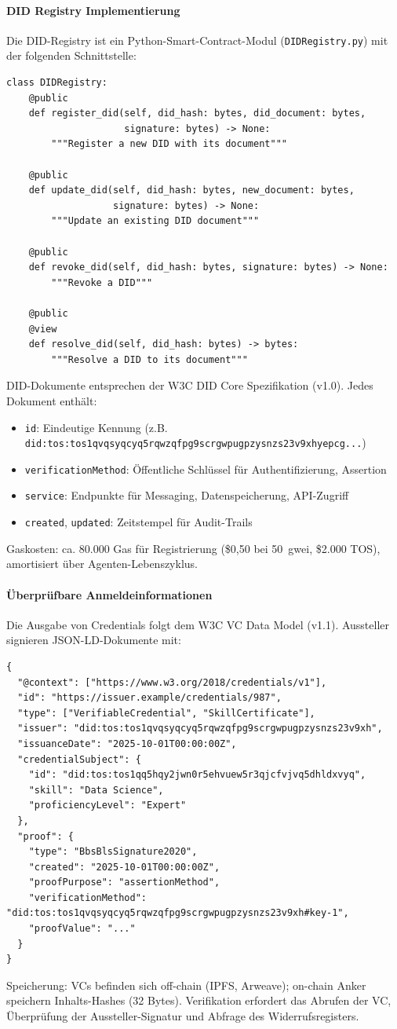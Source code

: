 \documentclass[11pt]{article}
\begin{document}
\paragraph{DID Registry Implementierung} Die DID-Registry ist ein Python-Smart-Contract-Modul (\texttt{DIDRegistry.py}) mit der folgenden Schnittstelle:
\begin{verbatim}
class DIDRegistry:
    @public
    def register_did(self, did_hash: bytes, did_document: bytes,
                     signature: bytes) -> None:
        """Register a new DID with its document"""

    @public
    def update_did(self, did_hash: bytes, new_document: bytes,
                   signature: bytes) -> None:
        """Update an existing DID document"""

    @public
    def revoke_did(self, did_hash: bytes, signature: bytes) -> None:
        """Revoke a DID"""

    @public
    @view
    def resolve_did(self, did_hash: bytes) -> bytes:
        """Resolve a DID to its document"""
\end{verbatim}
DID-Dokumente entsprechen der W3C DID Core Spezifikation (v1.0). Jedes Dokument enthält:
\begin{itemize}[noitemsep]
  \item \texttt{id}: Eindeutige Kennung (z.B. \texttt{did:tos:tos1qvqsyqcyq5rqwzqfpg9scrgwpugpzysnzs23v9xhyepcg...})
  \item \texttt{verificationMethod}: Öffentliche Schlüssel für Authentifizierung, Assertion
  \item \texttt{service}: Endpunkte für Messaging, Datenspeicherung, API-Zugriff
  \item \texttt{created}, \texttt{updated}: Zeitstempel für Audit-Trails
\end{itemize}
Gaskosten: ca. 80.000 Gas für Registrierung (\$0,50 bei 50~gwei, \$2.000 TOS), amortisiert über Agenten-Lebenszyklus.

\paragraph{Überprüfbare Anmeldeinformationen} Die Ausgabe von Credentials folgt dem W3C VC Data Model (v1.1). Aussteller signieren JSON-LD-Dokumente mit:
\begin{verbatim}
{
  "@context": ["https://www.w3.org/2018/credentials/v1"],
  "id": "https://issuer.example/credentials/987",
  "type": ["VerifiableCredential", "SkillCertificate"],
  "issuer": "did:tos:tos1qvqsyqcyq5rqwzqfpg9scrgwpugpzysnzs23v9xh",
  "issuanceDate": "2025-10-01T00:00:00Z",
  "credentialSubject": {
    "id": "did:tos:tos1qq5hqy2jwn0r5ehvuew5r3qjcfvjvq5dhldxvyq",
    "skill": "Data Science",
    "proficiencyLevel": "Expert"
  },
  "proof": {
    "type": "BbsBlsSignature2020",
    "created": "2025-10-01T00:00:00Z",
    "proofPurpose": "assertionMethod",
    "verificationMethod": "did:tos:tos1qvqsyqcyq5rqwzqfpg9scrgwpugpzysnzs23v9xh#key-1",
    "proofValue": "..."
  }
}
\end{verbatim}
Speicherung: VCs befinden sich off-chain (IPFS, Arweave); on-chain Anker speichern Inhalts-Hashes (32 Bytes). Verifikation erfordert das Abrufen der VC, Überprüfung der Aussteller-Signatur und Abfrage des Widerrufsregisters.
\end{document}
